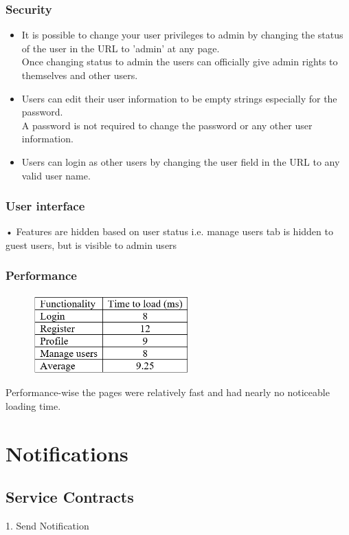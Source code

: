 \documentclass[english]{article}
\begin{document}
\subsubsection{Security}
\begin{itemize}
     \item It is possible to change your user privileges to admin by changing the status of the user in the URL to 'admin' at any page.\\
     Once changing status to admin the users can officially give admin rights to themselves and other users.
     \item Users can edit their user information to be empty strings especially for the password.\\
     A password is not required to change the password or any other user information.
     \item Users can login as other users by changing the user field in the URL to any valid user name.
   \end{itemize}
\subsubsection{User interface}
•	Features are hidden based on user status i.e. manage users tab is hidden to guest users, but is visible to admin users\\
\subsubsection{Performance}
\begin{figure}[H]
\includegraphics[width=60mm]{15.png}
\end{figure}
Performance-wise the pages were relatively fast and had nearly no noticeable loading time.
\section{Notifications}
\subsection{Service Contracts}
1.	Send Notification\\
\end{document}
